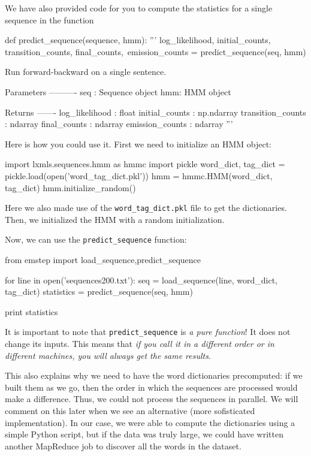 We have also provided code for you to compute the statistics for a single
sequence in the function 
\begin{python}
def predict_sequence(sequence, hmm):
    '''
    log_likelihood, initial_counts, transition_counts, final_counts,\
            emission_counts = predict_sequence(seq, hmm)

    Run forward-backward on a single sentence.

    Parameters
    ----------
    seq : Sequence object
    hmm: HMM object

    Returns
    -------
    log_likelihood : float
    initial_counts : np.ndarray
    transition_counts : ndarray
    final_counts : ndarray
    emission_counts : ndarray
    '''
\end{python}
Here is how you
could use it. First we need to initialize an HMM object:

\begin{python}
import lxmls.sequences.hmm as hmmc
import pickle
word_dict, tag_dict  = pickle.load(open('word_tag_dict.pkl'))
hmm = hmmc.HMM(word_dict, tag_dict)
hmm.initialize_random()
\end{python}

Here we also made use of the \verb+word_tag_dict.pkl+ file to get the
dictionaries. Then, we initialized the HMM with a random initialization.

Now, we can use the \verb+predict_sequence+ function:

\begin{python}
from emstep import load_sequence,predict_sequence

for line in open('sequences200.txt'):
    seq = load_sequence(line, word_dict, tag_dict)
    statistics = predict_sequence(seq, hmm)
    
print statistics
\end{python}

It is important to note that \verb+predict_sequence+ is \emph{a pure
function}! It does not change its inputs. This means that \emph{if you call it
in a different order or in different machines, you will always get the same
results}.

This also explains why we need to have the word dictionaries precomputed: if we
built them as we go, then the order in which the sequences are processed would
make a difference. Thus, we could not process the sequences in parallel. We
will comment on this later when we see an alternative (more sofisticated
implementation). In our case, we were able to compute the dictionaries using a
simple Python script, but if the data was truly large, we could have written
another MapReduce job to discover all the words in the dataset.

